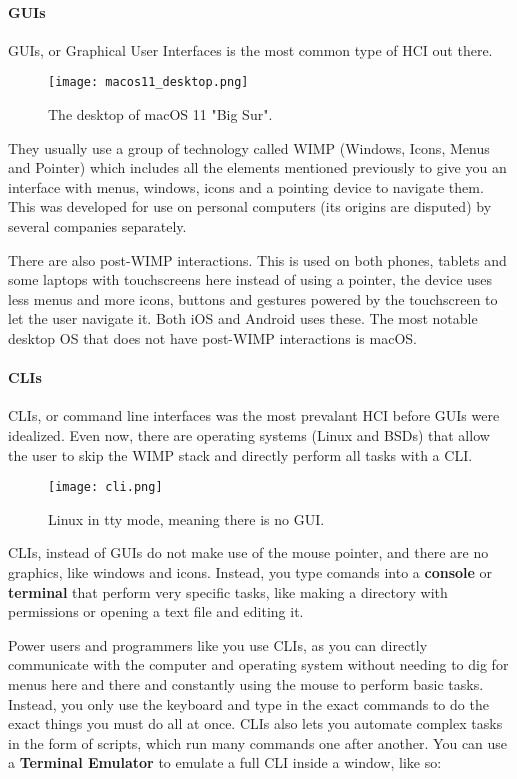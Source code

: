 \documentclass[../main.tex]{subfiles}
\begin{document}
\paragraph{GUIs}

GUIs, or Graphical User Interfaces is the most common type of HCI out there.

\begin{figure}[H]
    \centering
    \texttt{[image: macos11\_desktop.png]}
    \caption{The desktop of macOS 11 "Big Sur".}
    \label{fig:macos11:desktop}
\end{figure}

They usually use a group of technology called WIMP (Windows, Icons, Menus and Pointer) which includes all the elements mentioned previously to give you an interface with menus, windows, icons and a pointing device to navigate them. This was developed for use on personal computers (its origins are disputed) by several companies separately.

There are also post-WIMP interactions. This is used on both phones, tablets and some laptops with touchscreens here instead of using a pointer, the device uses less menus and more icons, buttons and gestures powered by the touchscreen to let the user navigate it. Both iOS and Android uses these. The most notable desktop OS that does not have post-WIMP interactions is macOS.

\paragraph{CLIs}

CLIs, or command line interfaces was the most prevalant HCI before GUIs were idealized. Even now, there are operating systems (Linux and BSDs) that allow the user to skip the WIMP stack and directly perform all tasks with a CLI.


\begin{figure}[H]
    \centering
    \texttt{[image: cli.png]}
    \caption{Linux in tty mode, meaning there is no GUI.}
    \label{fig:cli}
\end{figure}

CLIs, instead of GUIs do not make use of the mouse pointer, and there are no graphics, like windows and icons. Instead, you type comands into a \textbf{console} or \textbf{terminal} that perform very specific tasks, like making a directory with permissions or opening a text file and editing it.

Power users and programmers like you use CLIs, as you can directly communicate with the computer and operating system without needing to dig for menus here and there and constantly using the mouse to perform basic tasks. Instead, you only use the keyboard and type in the exact commands to do the exact things you must do all at once. CLIs also lets you automate complex tasks in the form of scripts, which run many commands one after another. You can use a \textbf{Terminal Emulator} to emulate a full CLI inside a window, like so:
\end{document}

